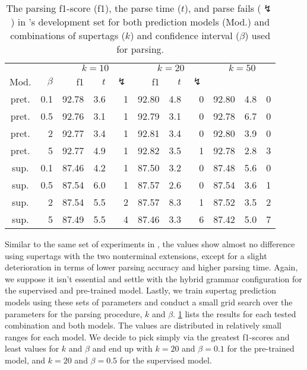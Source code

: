\documentclass[../../document.tex]{subfiles}
\begin{document}
    \begin{table}
        \caption{\label{tbl:experiments:tiger:k}
        The parsing f1-score (f1), the parse time ($t$), and parse fails ($\lightning$) in \tiger{}'s development set for both prediction models (Mod.) and combinations of supertags ($k$) and confidence interval ($\beta$) used for parsing.
        }
        \centering
        \setlength{\tabcolsep}{4pt}
        \vspace{.2cm}
        \begin{tabular}{cr|rrr|rrr|rrr}
            \toprule
&      &      \multicolumn{3}{c|}{$k = 10$} & \multicolumn{3}{c|}{$k = 20$} & \multicolumn{3}{c}{$k = 50$} \\
Mod. &  $\beta$  & f1 & $t$ & $\lightning$ & f1 & $t$ & $\lightning$ \\ \hline
pret. & 0.1  & 92.78 & 3.6 & 1 & 92.80 & 4.8 & 0 & 92.80 & 4.8 & 0 \\
pret. & 0.5  & 92.76 & 3.1 & 1 & 92.79 & 3.1 & 0 & 92.78 & 6.7 & 0 \\
pret. &   2  & 92.77 & 3.4 & 1 & 92.81 & 3.4 & 0 & 92.80 & 3.9 & 0 \\
pret. &   5  & 92.77 & 4.9 & 1 & 92.82 & 3.5 & 1 & 92.78 & 2.8 & 3 \\
\midrule
sup. & 0.1  & 87.46 & 4.2 & 1 & 87.50 & 3.2 & 0 & 87.48 & 5.6 & 0 \\
sup. & 0.5  & 87.54 & 6.0 & 1 & 87.57 & 2.6 & 0 & 87.54 & 3.6 & 1 \\
sup. &   2  & 87.54 & 5.5 & 2 & 87.57 & 8.3 & 1 & 87.52 & 3.5 & 2 \\
sup. &   5  & 87.49 & 5.5 & 4 & 87.46 & 3.3 & 6 & 87.42 & 5.0 & 7 \\
    \bottomrule
        \end{tabular}
    \end{table}

    Similar to the same set of experiments in , the values show almost no difference using  supertags with the two nonterminal extensions, except for a slight deterioration in terms of lower parsing accuracy and higher parsing time.
    Again, we suppose it isn't essential and settle with the hybrid grammar configuration for the supervised and pre-trained model.
    Lastly, we train supertag prediction models using these sets of parameters and conduct a small grid search over the parameters for the parsing procedure, $k$ and $\beta$.
    \cref{tbl:experiments:tiger:k} lists the results for each tested combination and both models.
    The values are distributed in relatively small ranges for each model.
    We decide to pick simply via the greatest f1-scores and least values for \(k\) and \(\beta\) and end up with \(k=20\) and \(\beta=0.1\) for the pre-trained model, and \(k=20\) and \(\beta=0.5\) for the supervised model.
\end{document}
